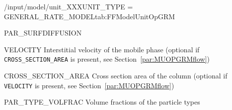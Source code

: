 \begin{condsubgroup}{/input/model/unit\_XXX}{UNIT\_TYPE = GENERAL\_RATE\_MODEL}{tab:FFModelUnitOpGRM}
\begin{dataset}[unit=\si{\square\metre\of{SP}\per\second},type=double,range={$\geq 0$},length={$\texttt{NTOTALBND}$ / $\texttt{NSEC} \cdot \texttt{NTOTALBND}$}]{PAR\_SURFDIFFUSION}
  \end{dataset}
  \begin{dataset}[unit=\si{\metre\per\second},type=double,range={$\mathds{R}$},length={1 / \texttt{NSEC}}]{VELOCITY}
    Interstitial velocity of the mobile phase (optional if \texttt{CROSS\_SECTION\_AREA} is present, see Section~\ref{par:MUOPGRMflow})
  \end{dataset}
  \begin{dataset}[unit=\si{\square\metre},type=double,range={$>0$},length={1}]{CROSS\_SECTION\_AREA}
    Cross section area of the column (optional if \texttt{VELOCITY} is present, see Section~\ref{par:MUOPGRMflow})
  \end{dataset}
  \begin{dataset}[unit=--,type=double,range={$[0,1]$},length={\texttt{NPARTYPE}}]{PAR\_TYPE\_VOLFRAC}
    Volume fractions of the particle types
  \end{dataset}
\end{condsubgroup}

